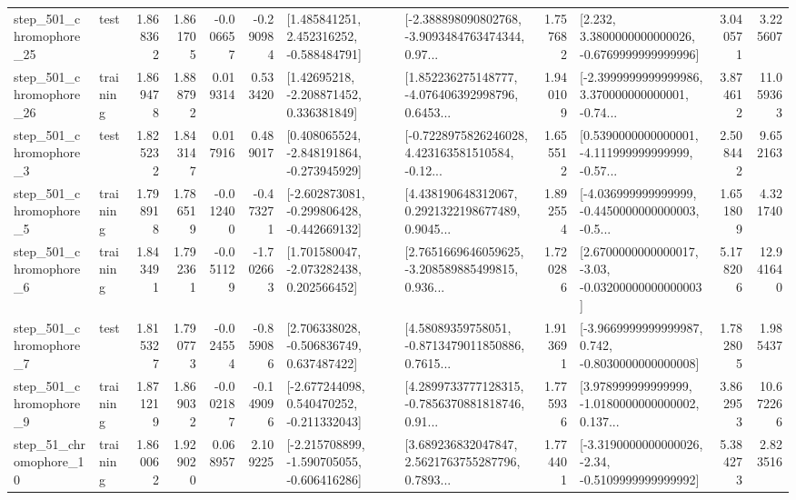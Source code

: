 \begin{tabular}{llrrrrllrlrr}
  step\_501\_chromophore\_25 &      test &      1.868362 &    1.861705 &     -0.006657 & -0.290984 &    [1.485841251, 2.452316252, -0.588484791] &  [-2.388898090802768, -3.9093484763474344, 0.97... &       1.757682 &   [2.232, 3.3800000000000026, -0.6769999999999996] &            3.040571 &          3.225607 \\
  step\_501\_chromophore\_26 &  training &      1.869478 &    1.888792 &      0.019314 &  0.533420 &     [1.42695218, -2.208871452, 0.336381849] &  [1.852236275148777, -4.076406392998796, 0.6453... &       1.940109 &  [-2.3999999999999986, 3.370000000000001, -0.74... &            3.874612 &         11.059363 \\
   step\_501\_chromophore\_3 &      test &      1.825232 &    1.843147 &      0.017916 &  0.489017 &   [0.408065524, -2.848191864, -0.273945929] &  [-0.7228975826246028, 4.423163581510584, -0.12... &       1.655512 &  [0.5390000000000001, -4.111999999999999, -0.57... &            2.508442 &          9.652163 \\
   step\_501\_chromophore\_5 &  training &      1.798918 &    1.786519 &     -0.012400 & -0.473271 &  [-2.602873081, -0.299806428, -0.442669132] &  [4.438190648312067, 0.2921322198677489, 0.9045... &       1.892554 &  [-4.036999999999999, -0.4450000000000003, -0.5... &            1.651809 &          4.321740 \\
   step\_501\_chromophore\_6 &  training &      1.843491 &    1.792361 &     -0.051129 & -1.702663 &    [1.701580047, -2.073282438, 0.202566452] &  [2.7651669646059625, -3.208589885499815, 0.936... &       1.720286 &  [2.6700000000000017, -3.03, -0.03200000000000003] &            5.178206 &         12.941640 \\
   step\_501\_chromophore\_7 &      test &      1.815327 &    1.790773 &     -0.024554 & -0.859086 &    [2.706338028, -0.506836749, 0.637487422] &  [4.58089359758051, -0.8713479011850886, 0.7615... &       1.913691 &  [-3.9669999999999987, 0.742, -0.8030000000000008] &            1.782805 &          1.985437 \\
   step\_501\_chromophore\_9 &  training &      1.871219 &    1.869032 &     -0.002187 & -0.149096 &   [-2.677244098, 0.540470252, -0.211332043] &  [4.2899733777128315, -0.7856370881818746, 0.91... &       1.775936 &  [3.978999999999999, -1.0180000000000002, 0.137... &            3.862953 &         10.672266 \\
   step\_51\_chromophore\_10 &  training &      1.860062 &    1.929020 &      0.068957 &  2.109225 &  [-2.215708899, -1.590705055, -0.606416286] &  [3.689236832047847, 2.5621763755287796, 0.7893... &       1.774401 &  [-3.3190000000000026, -2.34, -0.5109999999999992] &            5.384273 &          2.823516 \\

\end{tabular}
